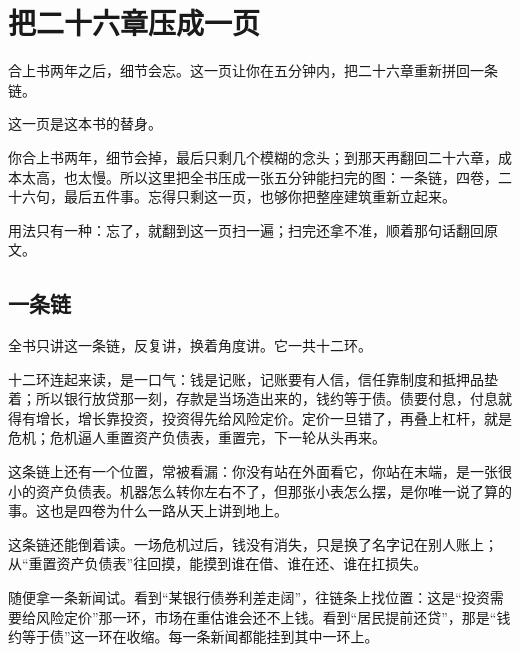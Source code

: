 \chapter{把二十六章压成一页}

\begin{ledetext}
合上书两年之后，细节会忘。这一页让你在五分钟内，把二十六章重新拼回一条链。
\end{ledetext}

这一页是这本书的替身。

你合上书两年，细节会掉，最后只剩几个模糊的念头；到那天再翻回二十六章，成本太高，也太慢。所以这里把全书压成一张五分钟能扫完的图：一条链，四卷，二十六句，最后五件事。忘得只剩这一页，也够你把整座建筑重新立起来。

用法只有一种：忘了，就翻到这一页扫一遍；扫完还拿不准，顺着那句话翻回原文。

\section{一条链}

全书只讲这一条链，反复讲，换着角度讲。它一共十二环。

\begin{chainflow}
\chainarrow {}\chainarrow {}\chainarrow {}\chainarrow {}\chainarrow {}\chainarrow {}\chainarrow {}\chainarrow {}\chainarrow {}\chainarrow {}\chainarrow {}
\end{chainflow}

十二环连起来读，是一口气：钱是记账，记账要有人信，信任靠制度和抵押品垫着；所以银行放贷那一刻，存款是当场造出来的，钱约等于债。债要付息，付息就得有增长，增长靠投资，投资得先给风险定价。定价一旦错了，再叠上杠杆，就是危机；危机逼人重置资产负债表，重置完，下一轮从头再来。

这条链上还有一个位置，常被看漏：你没有站在外面看它，你站在末端，是一张很小的资产负债表。机器怎么转你左右不了，但那张小表怎么摆，是你唯一说了算的事。这也是四卷为什么一路从天上讲到地上。

这条链还能倒着读。一场危机过后，钱没有消失，只是换了名字记在别人账上；从“重置资产负债表”往回摸，能摸到谁在借、谁在还、谁在扛损失。

随便拿一条新闻试。看到“某银行债券利差走阔”，往链条上找位置：这是“投资需要给风险定价”那一环，市场在重估谁会还不上钱。看到“居民提前还贷”，那是“钱约等于债”这一环在收缩。每一条新闻都能挂到其中一环上。

